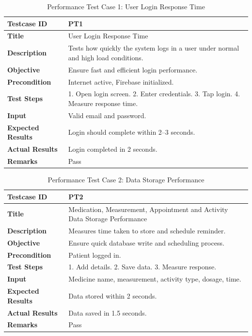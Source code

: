
\begin{table}[H]
\centering
\caption{Performance Test Case 1: User Login Response Time}
\begin{tabularx}{\textwidth}{|l|X|}
\hline
\textbf{Testcase ID} & PT1 \\ \hline
\textbf{Title} & User Login Response Time \\ \hline
\textbf{Description} & Tests how quickly the system logs in a user under normal and high load conditions. \\ \hline
\textbf{Objective} & Ensure fast and efficient login performance. \\ \hline
\textbf{Precondition} & Internet active, Firebase initialized. \\ \hline
\textbf{Test Steps} & 1. Open login screen. 2. Enter credentials. 3. Tap login. 4. Measure response time. \\ \hline
\textbf{Input} & Valid email and password. \\ \hline
\textbf{Expected Results} & Login should complete within 2--3 seconds. \\ \hline
\textbf{Actual Results} & Login completed in 2 seconds. \\ \hline
\textbf{Remarks} & Pass \\ \hline
\end{tabularx}
\end{table}

\begin{table}[H]
\centering
\caption{Performance Test Case 2: Data Storage Performance}
\begin{tabularx}{\textwidth}{|l|X|}
\hline
\textbf{Testcase ID} & PT2 \\ \hline
\textbf{Title} & Medication, Measurement, Appointment and Activity Data Storage Performance \\ \hline
\textbf{Description} & Measures time taken to store and schedule reminder. \\ \hline
\textbf{Objective} & Ensure quick database write and scheduling process. \\ \hline
\textbf{Precondition} & Patient logged in. \\ \hline
\textbf{Test Steps} & 1. Add details. 2. Save data. 3. Measure response. \\ \hline
\textbf{Input} & Medicine name, measurement, activity type, dosage, time. \\ \hline
\textbf{Expected Results} & Data stored within 2 seconds. \\ \hline
\textbf{Actual Results} & Data saved in 1.5 seconds. \\ \hline
\textbf{Remarks} & Pass \\ \hline
\end{tabularx}
\end{table}

